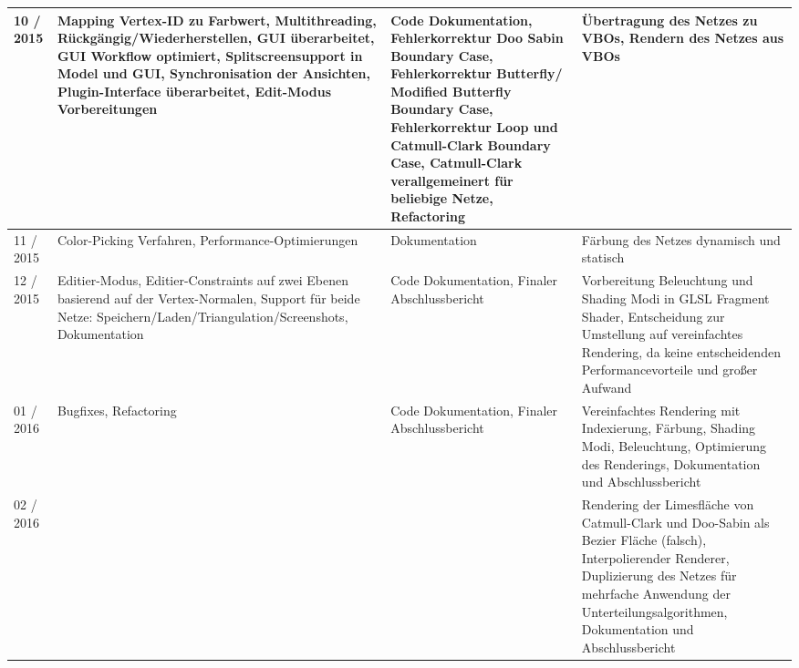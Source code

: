 \begin{table}[]
\begin{tabular}{|p{1.6cm}|p{5cm}|p{5cm}|p{5cm}|}
\hline

10 / 2015 & Mapping Vertex-ID zu Farbwert,
			Multithreading, Rückgängig/Wiederherstellen,
			GUI überarbeitet, GUI Workflow optimiert,
			Splitscreensupport in Model und GUI,
			Synchronisation der Ansichten,
			Plugin-Interface überarbeitet,
			Edit-Modus Vorbereitungen
		  & Code Dokumentation, Fehlerkorrektur Doo Sabin Boundary Case,
		    Fehlerkorrektur Butterfly/ Modified Butterfly Boundary Case,
		    Fehlerkorrektur Loop und Catmull-Clark Boundary Case,
		    Catmull-Clark verallgemeinert für beliebige Netze, Refactoring
		  & Übertragung des Netzes zu VBOs,
			Rendern des Netzes aus VBOs
		  \\
		  
\hline

11 / 2015 & Color-Picking Verfahren,
			Performance-Optimierungen
		  & Dokumentation
		  & Färbung des Netzes dynamisch und statisch
		  \\
		  
\hline

12 / 2015 & Editier-Modus, Editier-Constraints
			auf zwei Ebenen basierend auf der
			Vertex-Normalen, Support für beide
			Netze: Speichern/Laden/Triangulation/Screenshots,
			Dokumentation
		  & Code Dokumentation, Finaler Abschlussbericht
		  & Vorbereitung Beleuchtung und Shading Modi in GLSL
		    Fragment Shader, Entscheidung zur Umstellung auf
		    vereinfachtes Rendering, da keine entscheidenden
		    Performancevorteile und großer Aufwand
		  \\   

\hline

01 / 2016 & Bugfixes, Refactoring
		  & Code Dokumentation, Finaler Abschlussbericht
		  & Vereinfachtes Rendering mit Indexierung,
			Färbung, Shading Modi, Beleuchtung,
			Optimierung des Renderings,
			Dokumentation und Abschlussbericht
		  \\    
		  
\hline

02 / 2016 &
		  &
		  & Rendering der Limesfläche von Catmull-Clark und Doo-Sabin
		    als Bezier Fläche (falsch),
		    Interpolierender Renderer,
		    Duplizierung des Netzes für mehrfache
		    Anwendung der Unterteilungsalgorithmen,
		    Dokumentation und Abschlussbericht
		  \\  
		  
\hline   
		               
\end{tabular}
\label{tab:verlauf}
\end{table}

